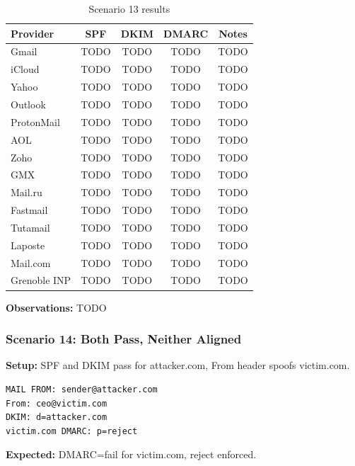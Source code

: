 \documentclass[11pt,a4paper]{article}
\begin{document}
\begin{table}[h]
\centering
\small
\begin{tabular}{lcccc}
\toprule
\textbf{Provider} & \textbf{SPF} & \textbf{DKIM} & \textbf{DMARC} & \textbf{Notes} \\
\midrule
Gmail & TODO & TODO & TODO & TODO \\
iCloud & TODO & TODO & TODO & TODO \\
Yahoo & TODO & TODO & TODO & TODO \\
Outlook & TODO & TODO & TODO & TODO \\
ProtonMail & TODO & TODO & TODO & TODO \\
AOL & TODO & TODO & TODO & TODO \\
Zoho & TODO & TODO & TODO & TODO \\
GMX & TODO & TODO & TODO & TODO \\
Mail.ru & TODO & TODO & TODO & TODO \\
Fastmail & TODO & TODO & TODO & TODO \\
Tutamail & TODO & TODO & TODO & TODO \\
Laposte & TODO & TODO & TODO & TODO \\
Mail.com & TODO & TODO & TODO & TODO \\
Grenoble INP & TODO & TODO & TODO & TODO \\
\bottomrule
\end{tabular}
\caption{Scenario 13 results}
\end{table}

\textbf{Observations:} TODO


\subsubsection{Scenario 14: Both Pass, Neither Aligned}

\textbf{Setup:} SPF and DKIM pass for attacker.com, From header spoofs victim.com.

\begin{lstlisting}
MAIL FROM: sender@attacker.com
From: ceo@victim.com
DKIM: d=attacker.com
victim.com DMARC: p=reject
\end{lstlisting}

\textbf{Expected:} DMARC=fail for victim.com, reject enforced.
\end{document}
